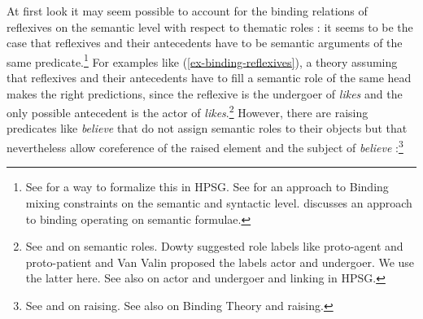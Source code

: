 \documentclass[output=paper,biblatex,babelshorthands,newtxmath,draftmode,colorlinks,citecolor=brown]{langscibook}
\begin{document}
At first look it may seem possible to account for the binding relations of reflexives on the
semantic level with respect to thematic roles \parencites[Section~4.10]{Jackendoff72a-u}{Wilkins1988a-u}[Chapter~6]{Williams1994a-u}:
it seems to be the case that reflexives and their antecedents have to be semantic
arguments of the same predicate.\footnote{%
  See \citet{Riezler95a} for a way to formalize this in HPSG. See  for an approach to
  Binding mixing constraints on the semantic and syntactic level.
 discusses an approach to binding operating on
semantic formulae.%
} For examples like (\ref{ex-binding-reflexives}), a theory assuming that reflexives and their antecedents have to
fill a semantic role of the same head makes the right predictions,
since the reflexive is the undergoer of \emph{likes} and the only possible antecedent is the actor of
\emph{likes}.\footnote{
  See  and  on semantic roles. Dowty suggested role labels like
  proto-agent and proto-patient and Van Valin proposed the labels actor and undergoer. We use the latter
  here. See also  on
  actor and undergoer and linking in HPSG.
} However, there are raising predicates like \emph{believe} that do not assign semantic roles
to their objects but that nevertheless allow coreference of the raised element and the subject of
\emph{believe} \citep[]{MS98a}:\footnote{%
 See  and  on raising. See also  on Binding
 Theory and raising.%
}
\end{document}
